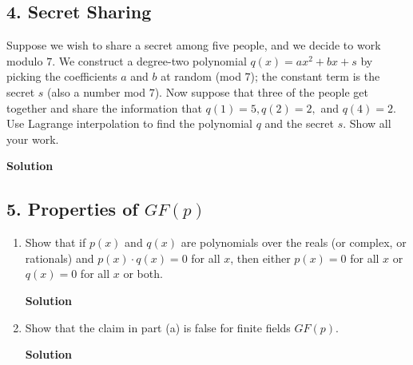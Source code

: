 \documentclass{article}\usepackage{amsmath,amssymb,amsthm,tikz,tkz-graph,color,chngpage,soul,hyperref,csquotes,graphicx,floatrow}\newcommand*{\QEDB}{\hfill\ensuremath{\square}}\newtheorem*{prop}{Proposition}\renewcommand{\theenumi}{\alph{enumi}}\usepackage[shortlabels]{enumitem}\usepackage[nobreak=true]{mdframed}\usetikzlibrary{matrix,calc}\MakeOuterQuote{"}\usepackage[margin=0.75in]{geometry} \newtheorem{theorem}{Theorem}
\begin{document}

\subsection*{4. Secret Sharing}
Suppose we wish to share a secret among five people, and we decide to work modulo $7$. We construct a degree-two polynomial $q(x)=ax^2+bx+s$ by picking the coefficients $a$ and $b$ at random (mod $7$); the constant term is the secret $s$ (also a number mod $7$). Now suppose that three of the people get together and share the information that $q(1)=5, q(2)=2,$ and $q(4)=2$. Use Lagrange interpolation to find the polynomial $q$ and the secret $s$. Show all your work.
\begin{mdframed}
\textbf{Solution}

\end{mdframed}
\clearpage


\subsection*{5. Properties of $GF(p)$}
\begin{enumerate}
\item Show that if $p(x)$ and $q(x)$ are polynomials over the reals (or complex, or rationals) and $p(x)\cdot q(x)=0$ for all $x$, then either $p(x)=0$ for all $x$ or $q(x)=0$ for all $x$ or both.
\begin{mdframed}
\textbf{Solution}

\end{mdframed}
\item Show that the claim in part (a) is false for finite fields $GF(p)$.
\begin{mdframed}
\textbf{Solution}

\end{mdframed}
\end{enumerate}
\clearpage
\end{document}
